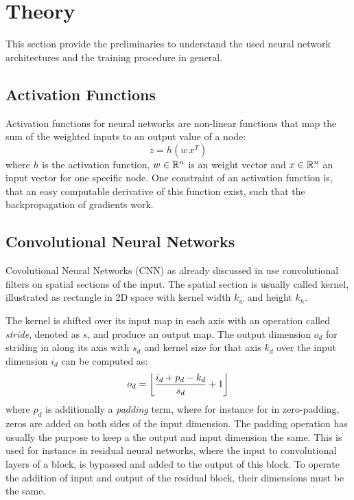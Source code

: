 
\section{Theory}\label{sec:nn_theory}
This section provide the preliminaries to understand the used neural network architectures and the training procedure in general.


\subsection{Activation Functions}\label{sec:nn_theory_acti}
Activation functions for neural networks are non-linear functions that map the sum of the weighted inputs to an output value of a node:
\begin{equation}\label{eq:nn_theory_acti}
  z = h(w \, x^T)
\end{equation}
where $h$ is the activation function, $w \in \R^n$ is an weight vector and $x \in \R^n$ an input vector for one specific node.
One constraint of an activation function is, that an easy computable derivative of this function exist, such that the backpropagation of gradients work.



\subsection{Convolutional Neural Networks}\label{sec:nn_theory_cnn}
Covolutional Neural Networks (CNN) as already discussed in  use convolutional filters on spatial sections of the input.
The spatial section is usually called kernel, illustrated as rectangle in 2D space with kernel width $k_w$ and height $k_h$.

The kernel is shifted over its input map in each axis with an operation called \emph{stride}, denoted as $s$, and produce an output map.
The output dimension $o_d$ for striding in along its axis with $s_d$ and kernel size for that axis $k_d$ over the input dimension $i_d$ can be computed as:
\begin{equation}\label{eq:nn_theory_cnn_}
  o_d = \floor*{\frac{i_d + p_d - k_d}{s_d} + 1}
\end{equation}
where $p_d$ is additionally a \emph{padding} term, where for instance for in zero-padding, zeros are added on both sides of the input dimension.
The padding operation has usually the purpose to keep a the output and input dimension the same.
This is used for instance in residual neural networks, where the input to convolutional layers of a block, is bypassed and added to the output of this block.
To operate the addition of input and output of the residual block, their dimensions must be the same.
